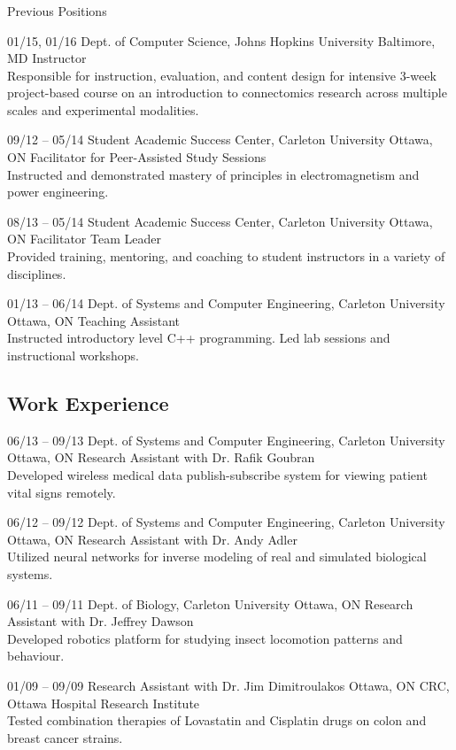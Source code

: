 \documentclass[]{friggeri-cv} %
\begin{document}
\subsubsection{}{Previous Positions}

\begin{entrylist}
\entry
{01/15, 01/16}
{Dept. of Computer Science, Johns Hopkins University}
{Baltimore, MD}
{Instructor\\
Responsible for instruction, evaluation, and content design for intensive 3-week project-based course on an introduction to connectomics research across multiple scales and experimental modalities.}

\entry
{09/12 -- 05/14}
{Student Academic Success Center, Carleton University}
{Ottawa, ON}
{Facilitator for Peer-Assisted Study Sessions\\
Instructed and demonstrated mastery of principles in electromagnetism and power engineering.}

\entry
{08/13 -- 05/14}
{Student Academic Success Center, Carleton University}
{Ottawa, ON}
{Facilitator Team Leader\\
Provided training, mentoring, and coaching to student instructors in a variety of disciplines.}

\entry
{01/13 -- 06/14}
{Dept. of Systems and Computer Engineering, Carleton University}
{Ottawa, ON}
{Teaching Assistant\\
Instructed introductory level C++ programming. Led lab sessions and instructional workshops.}
\end{entrylist}

\subsection{Work Experience}

\begin{entrylist}
\entry
{06/13 -- 09/13}
{Dept. of Systems and Computer Engineering, Carleton University}
{Ottawa, ON}
{Research Assistant with Dr. Rafik Goubran\\
Developed wireless medical data publish-subscribe system for viewing patient vital signs remotely.}

\entry
{06/12 -- 09/12}
{Dept. of Systems and Computer Engineering, Carleton University}
{Ottawa, ON}
{Research Assistant with Dr. Andy Adler\\
Utilized neural networks for inverse modeling of real and simulated biological systems.}

\entry
{06/11 -- 09/11}
{Dept. of Biology, Carleton University}
{Ottawa, ON}
{Research Assistant with Dr. Jeffrey Dawson\\
Developed robotics platform for studying insect locomotion patterns and behaviour.}

\entry
{01/09 -- 09/09}
{Research Assistant with Dr. Jim Dimitroulakos}
{Ottawa, ON}
{CRC, Ottawa Hospital Research Institute\\
Tested combination therapies of Lovastatin and Cisplatin drugs on colon and breast cancer strains.}
\end{entrylist}
\end{document}
